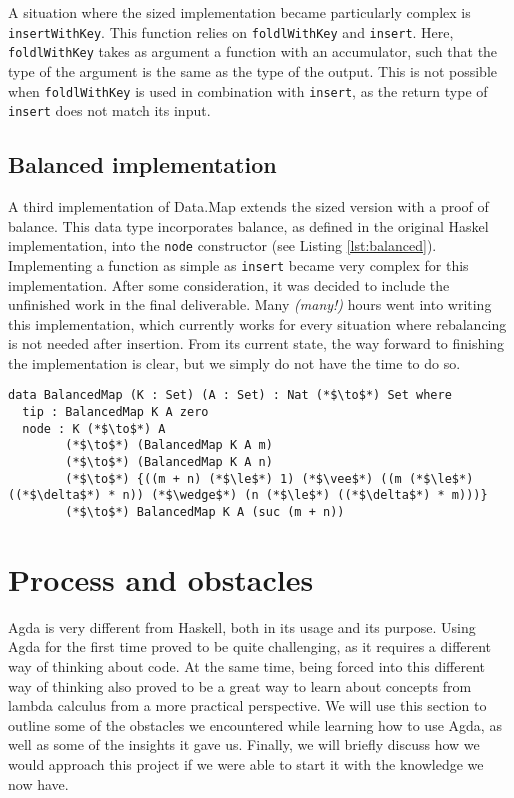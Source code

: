 \documentclass[a4paper,UKenglish,cleveref, autoref, thm-restate]{template/lipics-v2021}
\begin{document}
A situation where the sized implementation became particularly complex is \texttt{insertWithKey}. This function relies on \texttt{foldlWithKey} and \texttt{insert}. Here, \texttt{foldlWithKey} takes as argument a function with an accumulator, such that the type of the argument is the same as the type of the output. This is not possible when \texttt{foldlWithKey} is used in combination with \texttt{insert}, as the return type of \texttt{insert} does not match its input.

\subsection{Balanced implementation}
A third implementation of Data.Map extends the sized version with a proof of balance. This data type incorporates balance, as defined in the original Haskel implementation, into the \texttt{node} constructor (see Listing \ref{lst:balanced}). Implementing a function as simple as \texttt{insert} became very complex for this implementation. After some consideration, it was decided to include the unfinished work in the final deliverable. Many \textit{(many!)} hours went into writing this implementation, which currently works for every situation where rebalancing is not needed after insertion. From its current state, the way forward to finishing the implementation is clear, but we simply do not have the time to do so.

\begin{lstlisting}[label=lst:balanced,caption=Balanced map. The size of the map is defined like in the sized implementation. An extra argument is added to the node constructor that enforces balance.]
  data BalancedMap (K : Set) (A : Set) : Nat (*$\to$*) Set where
  tip : BalancedMap K A zero
  node : K (*$\to$*) A
        (*$\to$*) (BalancedMap K A m)
        (*$\to$*) (BalancedMap K A n)
        (*$\to$*) {((m + n) (*$\le$*) 1) (*$\vee$*) ((m (*$\le$*) ((*$\delta$*) * n)) (*$\wedge$*) (n (*$\le$*) ((*$\delta$*) * m)))}
        (*$\to$*) BalancedMap K A (suc (m + n))
\end{lstlisting}

\section{Process and obstacles}
Agda is very different from Haskell, both in its usage and its purpose. Using Agda for the first time proved to be quite challenging, as it requires a different way of thinking about code. At the same time, being forced into this different way of thinking also proved to be a great way to learn about concepts from lambda calculus from a more practical perspective. We will use this section to outline some of the obstacles we encountered while learning how to use Agda, as well as some of the insights it gave us. Finally, we will briefly discuss how we would approach this project if we were able to start it with the knowledge we now have.
\end{document}

